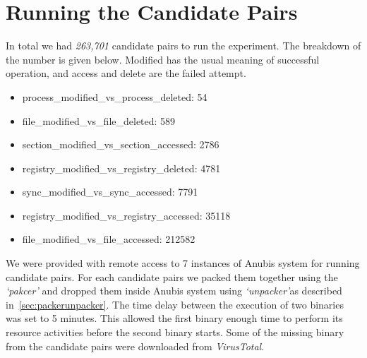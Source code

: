 \section{Running the Candidate Pairs}
\label{sec:Running the Candidate Pairs}
In total we had \emph{263,701} candidate pairs to run the experiment.
The breakdown of the number is given below.
Modified has the usual meaning of successful operation, and access and delete are the failed attempt.
\begin{itemize}
  \item process\_modified\_vs\_process\_deleted: 54
  \item file\_modified\_vs\_file\_deleted: 589
  \item section\_modified\_vs\_section\_accessed: 2786
  \item registry\_modified\_vs\_registry\_deleted: 4781
  \item sync\_modified\_vs\_sync\_accessed: 7791
  \item registry\_modified\_vs\_registry\_accessed: 35118
  \item file\_modified\_vs\_file\_accessed: 212582
\end{itemize}
We were provided with remote access to 7 instances of Anubis system for running candidate pairs.
For each candidate pairs we packed them together using the \emph{`pakcer'} and dropped them inside Anubis system using \emph{`unpacker'}as described in~\ref{sec:packerunpacker}.
The time delay between the execution of two binaries was set to 5 minutes.
This allowed the first binary enough time to perform its resource activities before the second binary starts.
Some of the missing binary from the candidate pairs were downloaded from \emph{VirusTotal}.
